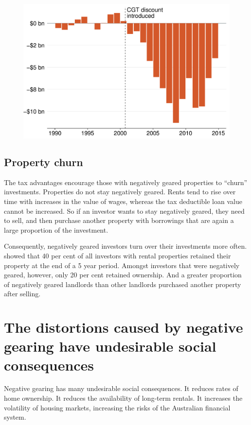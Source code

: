 \documentclass{grattan}\usepackage[]{graphicx}\usepackage[]{color}
\begin{document}
\begin{figure}

\includegraphics[width=\columnwidth]{CGT-NG-atlas//Net-rent-time-series-1}
\end{figure}

\subsection{Property churn}
The tax advantages encourage those with negatively geared properties to ``churn'' investments. Properties do not stay negatively geared. Rents tend to rise over time with increases in the value of wages, whereas the tax deductible loan value cannot be increased.  So if an investor wants to stay negatively geared, they need to sell, and then purchase another property with borrowings that are again a large proportion of the investment.

Consequently, negatively geared investors turn over their investments more often. \textcite{Wood2010a} showed that 40 per cent of all investors with rental properties retained their property at the end of a 5 year period.  Amongst investors that were negatively geared, however, only 20 per cent retained ownership. And a greater proportion of negatively geared landlords than other landlords purchased another property after selling.  

\section{The distortions caused by negative gearing have undesirable social consequences}
Negative gearing has many undesirable social consequences. It reduces rates of home ownership. It reduces the availability of long-term rentals. It increases the volatility of housing markets, increasing the risks of the Australian financial system. 
\end{document}

